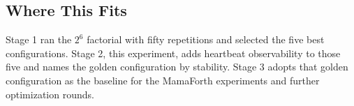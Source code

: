 \subsection{Where This Fits}

Stage 1 ran the $2^6$ factorial with fifty repetitions and selected the five
best configurations. Stage 2, this experiment, adds heartbeat observability to
those five and names the golden configuration by stability. Stage 3 adopts that
golden configuration as the baseline for the MamaForth experiments and further
optimization rounds.

